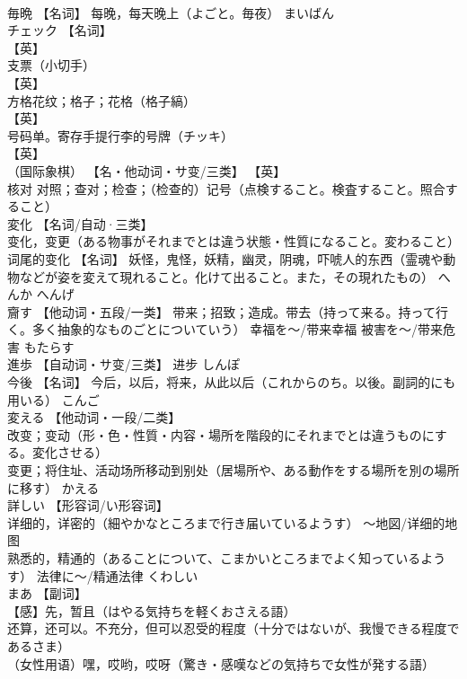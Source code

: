 \documentclass[8pt]{extreport}
\begin{document}
\begin{CJK}{UTF8}{min}
\\	毎晩	【名词】 每晚，每天晚上（よごと。毎夜）	まいばん	
\\	チェック	【名词】 
\\	【英】
\\	支票（小切手） 
\\	【英】
\\	方格花纹；格子；花格（格子縞） 
\\	【英】
\\	号码单。寄存手提行李的号牌（チッキ） 
\\	【英】
\\	（国际象棋） 【名・他动词・サ变/三类】 【英】
\\	核对 对照；查对；检查；（检查的）记号（点検すること。検査すること。照合すること）		
\\	変化	【名词/自动·三类】 
\\	变化，变更（ある物事がそれまでとは違う状態・性質になること。変わること） 
\\	词尾的变化 【名词】 妖怪，鬼怪，妖精，幽灵，阴魂，吓唬人的东西（霊魂や動物などが姿を変えて現れること。化けて出ること。また，その現れたもの）	へんか へんげ	
\\	齎す	【他动词・五段/一类】 带来；招致；造成。带去（持って来る。持って行く。多く抽象的なものごとについていう） 幸福を～/带来幸福 被害を～/带来危害	もたらす	
\\	進歩	【自动词・サ变/三类】 进步	しんぽ	
\\	今後	【名词】 今后，以后，将来，从此以后（これからのち。以後。副詞的にも用いる）	こんご	
\\	変える	【他动词・一段/二类】 
\\	改变；变动（形・色・性質・内容・場所を階段的にそれまでとは違うものにする。変化させる） 
\\	变更；将住址、活动场所移动到别处（居場所や、ある動作をする場所を別の場所に移す）	かえる	
\\	詳しい	【形容词/い形容词】 
\\	详细的，详密的（細やかなところまで行き届いているようす） ～地図/详细的地图 
\\	熟悉的，精通的（あることについて、こまかいところまでよく知っているようす） 法律に〜/精通法律	くわしい	
\\	まあ	【副词】 
\\	【感】先，暂且（はやる気持ちを軽くおさえる語） 
\\	还算，还可以。不充分，但可以忍受的程度（十分ではないが、我慢できる程度であるさま） 
\\	（女性用语）嘿，哎哟，哎呀（驚き・感嘆などの気持ちで女性が発する語）		

\end{CJK}
\end{document}
